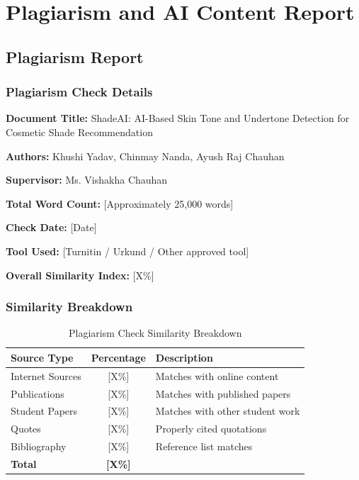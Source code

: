 \chapter{Plagiarism and AI Content Report}

\section{Plagiarism Report}

\subsection{Plagiarism Check Details}

\textbf{Document Title:} ShadeAI: AI-Based Skin Tone and Undertone Detection for Cosmetic Shade Recommendation

\textbf{Authors:} Khushi Yadav, Chinmay Nanda, Ayush Raj Chauhan

\textbf{Supervisor:} Ms. Vishakha Chauhan

\textbf{Total Word Count:} [Approximately 25,000 words]

\textbf{Check Date:} [Date]

\textbf{Tool Used:} [Turnitin / Urkund / Other approved tool]

\textbf{Overall Similarity Index:} [X\%]

\subsection{Similarity Breakdown}

\begin{table}[h]
\centering
\begin{tabular}{|l|c|p{6cm}|}
\hline
\textbf{Source Type} & \textbf{Percentage} & \textbf{Description} \\
\hline
Internet Sources & [X\%] & Matches with online content \\
Publications & [X\%] & Matches with published papers \\
Student Papers & [X\%] & Matches with other student work \\
Quotes & [X\%] & Properly cited quotations \\
Bibliography & [X\%] & Reference list matches \\
\hline
\textbf{Total} & \textbf{[X\%]} & \\
\hline
\end{tabular}
\caption{Plagiarism Check Similarity Breakdown}
\end{table}

